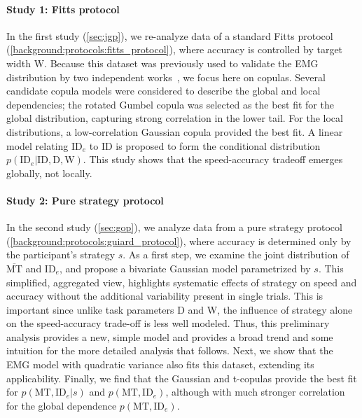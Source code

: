 \documentclass[acmlarge, manuscript,review]{acmart}
\newcommand{\mmt}{\ensuremath{\overline{\mt}}\xspace}
\newcommand{\mt}{\ensuremath{{\text{MT}}}\xspace}
\newcommand{\ide}{\ensuremath{{\text{ID}_e}}\xspace}
\newcommand{\D}{\ensuremath{{\text{D}}}\xspace}
\newcommand{\W}{\ensuremath{{\text{W}}}\xspace}
\begin{document}
\paragraph*{Study 1: Fitts protocol} 
In the first study (\autoref{sec:jgp}), we re-analyze data of a standard Fitts protocol (\autoref{background:protocols:fitts_protocol}), where accuracy is controlled by target width \W. 
Because this dataset was previously used to validate the EMG distribution by two independent works~\cite{gori2018these,zhao2022}, we focus here on copulas.
Several candidate copula models were considered to describe the global and local dependencies; the rotated Gumbel copula was selected as the best fit for the global distribution, capturing strong correlation in the lower tail. 
For the local distributions, a low-correlation Gaussian copula provided the best fit. 
A linear model relating \ide to ID is proposed to form the conditional distribution $p(\ide | \text{ID}, \D, \W)$. 
This study shows that the speed-accuracy tradeoff emerges globally, not locally.


\paragraph*{Study 2: Pure strategy protocol} 
In the second study (\autoref{sec:gop}), we analyze data from a pure strategy protocol (\autoref{background:protocols:guiard_protocol}), where accuracy is determined only by the participant's strategy $s$. 
As a first step, we examine the joint distribution of \mmt and \ide,  and propose a bivariate Gaussian model parametrized by $s$. 
This simplified, aggregated view, highlights systematic effects of strategy on speed and accuracy without the additional variability present in single trials. This is important since unlike task parameters D and W, the influence of strategy alone on the speed-accuracy trade-off is less well modeled.
Thus, this preliminary analysis provides a new, simple model and provides a broad trend and some intuition for the more detailed analysis that follows.
Next, we show that the EMG model with quadratic variance also fits this dataset, extending its applicability. 
Finally, we find that the Gaussian and t-copulas provide the best fit for $p(\mt, \ide | s)$ and $p(\mt, \ide)$, although with much stronger correlation for the global dependence $p(\mt, \ide)$.
\end{document}
